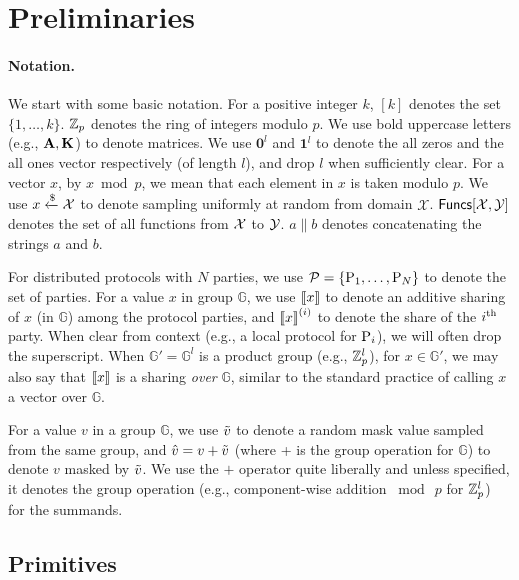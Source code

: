 
\section{Preliminaries}
\label{sec:preliminaries}

\paragraph{Notation.} We start with some basic notation.
For a positive integer $k$, $[k]$ denotes the set $\{1,\dots, k\}$. $\mathbb{Z}_p$ denotes the ring of integers modulo $p$. We use bold uppercase letters (e.g., $\mat{A}, \mat{K}$) to denote matrices. We use $\textbf{0}^l$ and $\textbf{1}^l$ to denote the all zeros and the all ones vector respectively (of length $l$), and drop $l$ when sufficiently clear. For a vector $x$, by $x \bmod p$, we mean that each element in $x$ is taken modulo $p$. We use $x \xleftarrow{\$} \mathcal{X}$ to denote sampling uniformly at random from domain $\mathcal{X}$. $\mathsf{Funcs}[\mathcal{X}, \mathcal{Y}]$ denotes the set of all functions from $\mathcal{X}$ to $\mathcal{Y}$. $a \parallel b$ denotes concatenating the strings $a$ and $b$.

For distributed protocols with $N$ parties, we use $\mathcal{P} = \{\textnormal{P}_1, \dots, \textnormal{P}_N\}$ to denote the set of parties. For a value $x$ in group $\mathbb{G}$, we use $\left\llbracket x \right\rrbracket$ to denote an additive sharing of $x$ (in $\mathbb{G}$) among the protocol parties, and $\left\llbracket x \right\rrbracket^{(i)}$ to denote the share of the $i^{\textnormal{th}}$ party. When clear from context (e.g., a local protocol for $\textnormal{P}_i$), we will often drop the superscript. When $\mathbb{G}' =  \mathbb{G}^l$ is a product group (e.g., $\mathbb{Z}_p^l$), for $x \in \mathbb{G}'$, we may also say that $\left\llbracket x \right\rrbracket$ is a sharing \textit{over} $\mathbb{G}$, similar to the standard practice of calling $x$ a vector over $\mathbb{G}$.

For a value $v$ in a group $\mathbb{G}$, we use $\tilde{v}$ to denote a random mask value sampled from the same group, and $\hat{v} = v + \tilde{v}$ (where + is the group operation for $\mathbb{G}$) to denote $v$ masked by $\tilde{v}$. We use the $+$ operator quite liberally and unless specified, it denotes the group operation (e.g., component-wise addition $\bmod~p$ for $\mathbb{Z}_p^l$) for the summands.


\subsection{Primitives}

